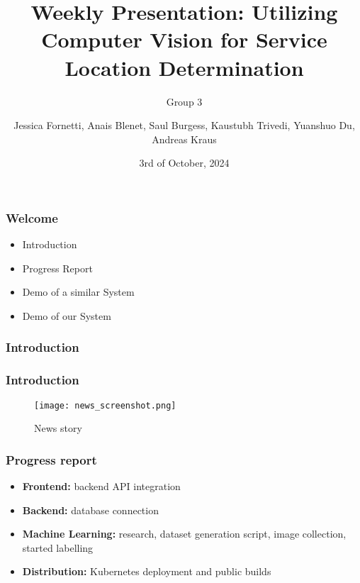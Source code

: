 \documentclass{beamer}
\title[Weekly Presentation]{Weekly Presentation: Utilizing Computer Vision for
Service Location Determination}
\subtitle{Group 3}
\author{Jessica Fornetti, Anais Blenet, Saul Burgess, Kaustubh Trivedi, Yuanshuo Du, Andreas Kraus}
\institute{TU Dublin}
\date{3rd of October, 2024}
\begin{document}
\frame{\titlepage}

\begin{frame}
    \frametitle{Welcome}
    \vspace{10pt} %
    
    \begin{itemize}
        \item{Introduction}
        \item{Progress Report}
        \item{Demo of a similar System}
        \item{Demo of our System}
    \end{itemize}
\end{frame}

\begin{frame}
    \frametitle{Introduction}
    \vspace{10pt} %

\end{frame}

\begin{frame}
    \frametitle{Introduction}
    \vspace{10pt} %
    \begin{figure}
        \centering{}
        \texttt{[image: news\_screenshot.png]}
        \caption{News story}
        \label{fig:news_story}
    \end{figure}
\end{frame}

\begin{frame}
    \frametitle{Progress report}
    \begin{itemize}
        \item\textbf{Frontend:} backend API integration
        \item\textbf{Backend:} database connection
        \item\textbf{Machine Learning:} research, dataset generation script, image collection, started labelling
        \item\textbf{Distribution:} Kubernetes deployment and public builds

    \end{itemize}

\end{frame}
\end{document}
